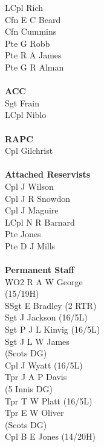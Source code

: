 \begin{multicols}{4}
  LCpl Rich \\
  Cfn E C Beard \\
  Cfn Cummins \\
  Pte G Robb \\
  Pte R A James \\
  Pte G R Alman \\
  \\
  \textbf{ACC} \\
  Sgt Frain \\
  LCpl Niblo \\
  \\
  \textbf{RAPC} \\
  Cpl Gilchrist \\
  \\
  \textbf{Attached Reservists} \\
  Cpl J Wilson \\
  Cpl J R Snowdon \\
  Cpl J Maguire \\
  LCpl N R Barnard \\
  Pte Jones \\
  Pte D J Mills \\
  \\
  \textbf{Permanent Staff} \\
  WO2 R A W George \\ \indent (15/19H) \\
  SSgt E Bradley (2 RTR) \\
  Sgt J Jackson (16/5L) \\
  Sgt P J L Kinvig (16/5L) \\
  Sgt J L W James \\ \indent (Scots DG) \\
  Cpl J Wyatt (16/5L) \\
  Tpr J A P Davis \\ \indent (5 Innis DG) \\
  Tpr T W Platt (16/5L) \\
  Tpr E W Oliver \\ \indent (Scots DG) \\
  Cpl B E Jones (14/20H)
\end{multicols}

\pagebreak

